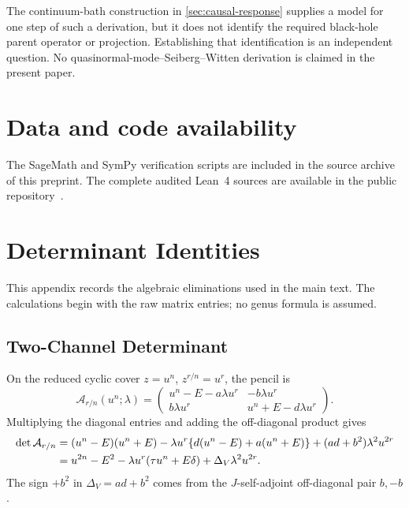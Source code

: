 \documentclass[11pt,reqno]{amsart}
\theoremstyle{remark}
\newcommand{\cA}{\mathcal A}
\begin{document}
The continuum-bath construction in \cref{sec:causal-response} supplies a
model for one step of such a derivation, but it does not identify the required
black-hole parent operator or projection.  Establishing that identification
is an independent question.  No quasinormal-mode--Seiberg--Witten derivation
is claimed in the present paper.


\section*{Data and code availability}
The SageMath and SymPy verification scripts are included in the source
archive of this preprint.  The complete audited Lean~4 sources are
available in the public repository~\cite{leanformalizations}.

\appendix
\section{Determinant Identities}\label{app:determinants}

This appendix records the algebraic eliminations used in the main text.  The
calculations begin with the raw matrix entries; no genus formula is assumed.

\subsection{Two-Channel Determinant}

On the reduced cyclic cover $z=u^n$, $z^{r/n}=u^r$, the pencil is
\begin{equation}\label{eq:app-lifted-matrix}
 \cA_{r/n}(u^n;\lambda)=
 \begin{pmatrix}
 u^n-E-a\lambda u^r&-b\lambda u^r\\
 b\lambda u^r&u^n+E-d\lambda u^r
 \end{pmatrix}.
\end{equation}
Multiplying the diagonal entries and adding the off-diagonal product gives
\begin{align}
 \det\cA_{r/n}
 &=(u^n-E)(u^n+E)
 -\lambda u^r\{d(u^n-E)+a(u^n+E)\}
 +(ad+b^2)\lambda^2u^{2r}\notag\\
 &=u^{2n}-E^2
 -\lambda u^r(\tau u^n+E\delta)
 +\Delta_V\lambda^2u^{2r}.
 \label{eq:app-raw-determinant}
\end{align}
The sign $+b^2$ in $\Delta_V=ad+b^2$ comes from the $J$-self-adjoint
off-diagonal pair $b,-b$.
\end{document}
